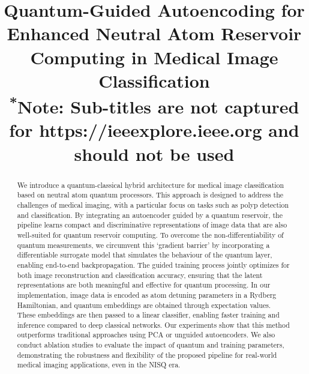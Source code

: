 \documentclass[conference]{IEEEtran}
\begin{document}
\title{Quantum-Guided Autoencoding for Enhanced Neutral Atom Reservoir Computing in Medical Image Classification\\
{\footnotesize \textsuperscript{*}Note: Sub-titles are not captured for https://ieeexplore.ieee.org  and
should not be used}
}

\author{

\and
{}
}

\maketitle


\begin{abstract}
We introduce a quantum-classical hybrid 
architecture for medical image classification 
based on neutral atom quantum processors. 
This approach is designed to address the challenges of 
medical imaging, with a particular focus on tasks such 
as polyp detection and classification.
By integrating an autoencoder guided by a quantum 
reservoir, the pipeline learns compact and discriminative 
representations of image data that are also well-suited for quantum reservoir 
computing. To overcome the non-differentiability of quantum 
measurements, we circumvent this `gradient barrier' 
by incorporating a differentiable surrogate model that simulates the 
behaviour of the quantum layer, enabling end-to-end backpropagation. 
The guided training process jointly optimizes for both image 
reconstruction and classification accuracy, ensuring that the latent 
representations are both meaningful and effective for quantum processing. 
In our implementation, image data is encoded as atom detuning parameters 
in a Rydberg Hamiltonian, and quantum embeddings are obtained through expectation 
values. These embeddings are then passed to a linear classifier, 
enabling faster training and inference compared to deep classical networks.
Our experiments show that this method outperforms traditional 
approaches using PCA or unguided autoencoders. We also conduct 
ablation studies to evaluate the impact of quantum and training 
parameters, demonstrating the robustness and flexibility of the 
proposed pipeline for real-world medical imaging applications, 
even in the NISQ era.
\end{abstract}
\end{document}
